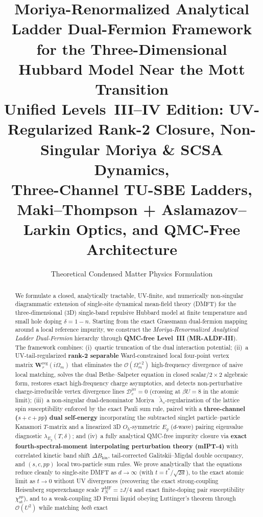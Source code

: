 \documentclass[11pt,a4paper]{article}
\title{\Large\bfseries
    Moriya-Renormalized Analytical Ladder Dual-Fermion Framework\\
    for the Three-Dimensional Hubbard Model Near the Mott Transition\\[0.4em]
    \normalsize\normalfont
    Unified Levels~III--IV Edition: UV-Regularized Rank-2 Closure, Non-Singular Moriya \& SCSA Dynamics,\\
    Three-Channel TU-SBE Ladders, Maki--Thompson + Aslamazov--Larkin Optics, and QMC-Free Architecture}
\author{Theoretical Condensed Matter Physics Formulation}
\date{}
\numberwithin{equation}{section}
\theoremstyle{plain}
\theoremstyle{definition}
\begin{document}
\maketitle

\begin{abstract}
We formulate a closed, analytically tractable, UV-finite, and numerically non-singular
diagrammatic extension of single-site dynamical mean-field theory (DMFT) for the
three-dimensional (3D) single-band repulsive Hubbard model at finite temperature and
small hole doping $\delta = 1 - n$. Starting from the exact Grassmann dual-fermion
mapping around a local reference impurity, we construct the \emph{Moriya-Renormalized
Analytical Ladder Dual-Fermion} hierarchy through \textbf{QMC-free Level~III}
(\textbf{MR-ALDF-III}). The framework combines:
(i)~quartic truncation of the dual interaction potential;
(ii)~a UV-tail-regularized \textbf{rank-2 separable} Ward-constrained local four-point
vertex matrix $\mathbf{W}_r^{\mathrm{reg}}(i\Omega_m)$ that eliminates the
$\mathcal{O}(\Omega_m^{+2})$ high-frequency divergence of naive local matching, solves
the dual Bethe--Salpeter equation in closed scalar/$2\times 2$ algebraic form, restores
exact high-frequency charge asymptotics, and detects non-perturbative charge-irreducible
vertex divergence lines $\mathcal{D}_c^{\mathrm{irr}} = 0$ (crossing at $\beta U = 8$
in the atomic limit);
(iii)~a non-singular dual-denominator Moriya~\cite{Moriya1985,Katanin2009,Rohringer2016} $\tilde{\lambda}_s$-regularization of the
lattice spin susceptibility enforced by the exact Pauli sum rule, paired with a
\textbf{three-channel ($s+c+pp$) dual self-energy} incorporating the subtracted singlet
particle--particle Kanamori $T$-matrix and a linearized 3D $O_h$-symmetric $E_g$
($d$-wave) pairing eigenvalue diagnostic $\lambda_{E_g}(T,\delta)$; and
(iv)~a fully analytical QMC-free impurity closure via \textbf{exact fourth-spectral-moment
interpolating perturbation theory (mIPT-4)} with correlated kinetic band shift
$\Delta B_{\mathrm{kin}}$, tail-corrected Galitskii--Migdal double occupancy, and
$(s,c,pp)$ local two-particle sum rules. We prove analytically that the equations reduce
cleanly to single-site DMFT as $d \to \infty$ (with $t = t^*/\sqrt{2d}$), to the exact
atomic limit as $t \to 0$ without UV divergences (recovering the exact strong-coupling
Heisenberg superexchange scale $T_N^{\mathrm{MF}} = zJ/4$ and exact finite-doping pair
susceptibility $\chi_{\mathrm{at}}^{pp}$), and to a weak-coupling 3D Fermi liquid
obeying Luttinger's theorem through $\mathcal{O}(U^2)$ while matching \emph{both} exact

\end{abstract}
\end{document}
